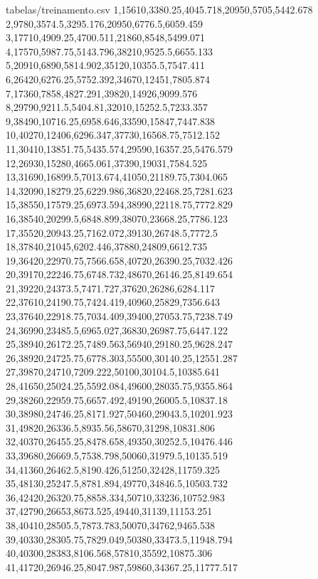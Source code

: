 \begin{filecontents*}{tabelas/treinamento.csv}
1,15610,3380.25,4045.718,20950,5705,5442.678
2,9780,3574.5,3295.176,20950,6776.5,6059.459
3,17710,4909.25,4700.511,21860,8548,5499.071
4,17570,5987.75,5143.796,38210,9525.5,6655.133
5,20910,6890,5814.902,35120,10355.5,7547.411
6,26420,6276.25,5752.392,34670,12451,7805.874
7,17360,7858,4827.291,39820,14926,9099.576
8,29790,9211.5,5404.81,32010,15252.5,7233.357
9,38490,10716.25,6958.646,33590,15847,7447.838
10,40270,12406,6296.347,37730,16568.75,7512.152
11,30410,13851.75,5435.574,29590,16357.25,5476.579
12,26930,15280,4665.061,37390,19031,7584.525
13,31690,16899.5,7013.674,41050,21189.75,7304.065
14,32090,18279.25,6229.986,36820,22468.25,7281.623
15,38550,17579.25,6973.594,38990,22118.75,7772.829
16,38540,20299.5,6848.899,38070,23668.25,7786.123
17,35520,20943.25,7162.072,39130,26748.5,7772.5
18,37840,21045,6202.446,37880,24809,6612.735
19,36420,22970.75,7566.658,40720,26390.25,7032.426
20,39170,22246.75,6748.732,48670,26146.25,8149.654
21,39220,24373.5,7471.727,37620,26286,6284.117
22,37610,24190.75,7424.419,40960,25829,7356.643
23,37640,22918.75,7034.409,39400,27053.75,7238.749
24,36990,23485.5,6965.027,36830,26987.75,6447.122
25,38940,26172.25,7489.563,56940,29180.25,9628.247
26,38920,24725.75,6778.303,55500,30140.25,12551.287
27,39870,24710,7209.222,50100,30104.5,10385.641
28,41650,25024.25,5592.084,49600,28035.75,9355.864
29,38260,22959.75,6657.492,49190,26005.5,10837.18
30,38980,24746.25,8171.927,50460,29043.5,10201.923
31,49820,26336.5,8935.56,58670,31298,10831.806
32,40370,26455.25,8478.658,49350,30252.5,10476.446
33,39680,26669.5,7538.798,50060,31979.5,10135.519
34,41360,26462.5,8190.426,51250,32428,11759.325
35,48130,25247.5,8781.894,49770,34846.5,10503.732
36,42420,26320.75,8858.334,50710,33236,10752.983
37,42790,26653,8673.525,49440,31139,11153.251
38,40410,28505.5,7873.783,50070,34762,9465.538
39,40330,28305.75,7829.049,50380,33473.5,11948.794
40,40300,28383,8106.568,57810,35592,10875.306
41,41720,26946.25,8047.987,59860,34367.25,11777.517
\end{filecontents*}